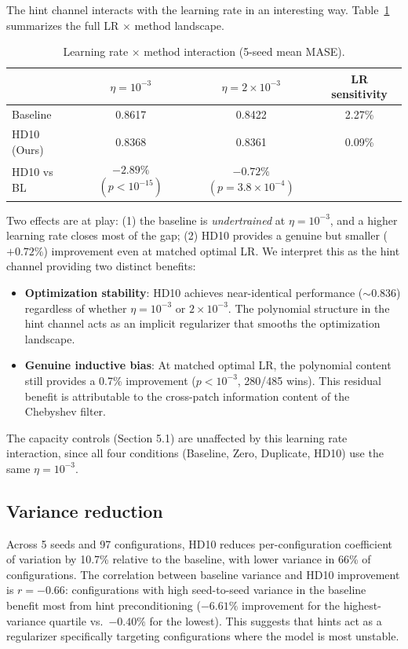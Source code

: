 \documentclass[11pt]{article}
\begin{document}
The hint channel interacts with the learning rate in an interesting way. Table~\ref{tab:lr_landscape} summarizes the full LR $\times$ method landscape.

\begin{table}[h]
\centering
\caption{Learning rate $\times$ method interaction (5-seed mean MASE).}
\label{tab:lr_landscape}
\small
\begin{tabular}{lccc}
\toprule
& $\eta = 10^{-3}$ & $\eta = 2 \times 10^{-3}$ & LR sensitivity \\
\midrule
Baseline & 0.8617 & 0.8422 & 2.27\% \\
HD10 (Ours) & 0.8368 & 0.8361 & 0.09\% \\
\midrule
HD10 vs BL & $-2.89\%$ $(p < 10^{-15})$ & $-0.72\%$ $(p = 3.8 \times 10^{-4})$ & \\
\bottomrule
\end{tabular}
\end{table}

Two effects are at play: (1) the baseline is \emph{undertrained} at $\eta = 10^{-3}$, and a higher learning rate closes most of the gap; (2) HD10 provides a genuine but smaller ($+0.72\%$) improvement even at matched optimal LR. We interpret this as the hint channel providing two distinct benefits:
\begin{itemize}
    \item \textbf{Optimization stability}: HD10 achieves near-identical performance ($\sim$0.836) regardless of whether $\eta = 10^{-3}$ or $2 \times 10^{-3}$. The polynomial structure in the hint channel acts as an implicit regularizer that smooths the optimization landscape.
    \item \textbf{Genuine inductive bias}: At matched optimal LR, the polynomial content still provides a 0.7\% improvement ($p < 10^{-3}$, 280/485 wins). This residual benefit is attributable to the cross-patch information content of the Chebyshev filter.
\end{itemize}

The capacity controls (Section 5.1) are unaffected by this learning rate interaction, since all four conditions (Baseline, Zero, Duplicate, HD10) use the same $\eta = 10^{-3}$.

\subsection{Variance reduction}

Across 5 seeds and 97 configurations, HD10 reduces per-configuration coefficient of variation by 10.7\% relative to the baseline, with lower variance in 66\% of configurations. The correlation between baseline variance and HD10 improvement is $r = -0.66$: configurations with high seed-to-seed variance in the baseline benefit most from hint preconditioning ($-6.61\%$ improvement for the highest-variance quartile vs.\ $-0.40\%$ for the lowest). This suggests that hints act as a regularizer specifically targeting configurations where the model is most unstable.
\end{document}
